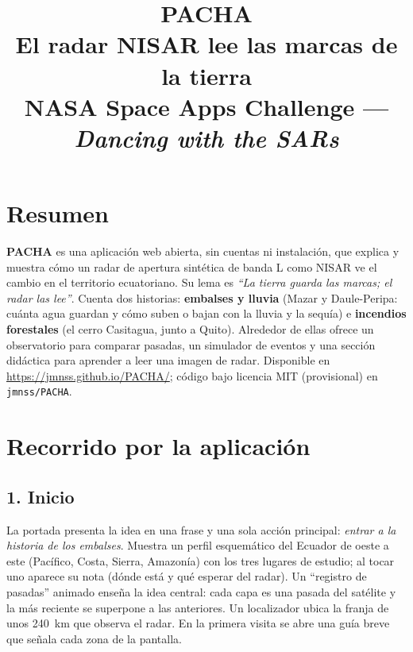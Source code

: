 \documentclass[11pt,a4paper]{article}
\title{\textbf{PACHA}\\[2pt]\large El radar NISAR lee las marcas de la tierra\\[2pt]\normalsize NASA Space Apps Challenge --- \emph{Dancing with the SARs}}
\author{}\date{}
\begin{document}
\maketitle\vspace{-2.5em}

\section*{Resumen}
\textbf{PACHA} es una aplicación web abierta, sin cuentas ni instalación, que explica y muestra cómo un radar de apertura sintética de banda L como NISAR ve el cambio en el territorio ecuatoriano. Su lema es \emph{``La tierra guarda las marcas; el radar las lee''}. Cuenta dos historias: \textbf{embalses y lluvia} (Mazar y Daule-Peripa: cuánta agua guardan y cómo suben o bajan con la lluvia y la sequía) e \textbf{incendios forestales} (el cerro Casitagua, junto a Quito). Alrededor de ellas ofrece un observatorio para comparar pasadas, un simulador de eventos y una sección didáctica para aprender a leer una imagen de radar. Disponible en \url{https://jmnss.github.io/PACHA/}; código bajo licencia MIT (provisional) en \texttt{jmnss/PACHA}.

\section*{Recorrido por la aplicación}

\subsection*{1. Inicio}
La portada presenta la idea en una frase y una sola acción principal: \emph{entrar a la historia de los embalses}. Muestra un perfil esquemático del Ecuador de oeste a este (Pacífico, Costa, Sierra, Amazonía) con los tres lugares de estudio; al tocar uno aparece su nota (dónde está y qué esperar del radar). Un ``registro de pasadas'' animado enseña la idea central: cada capa es una pasada del satélite y la más reciente se superpone a las anteriores. Un localizador ubica la franja de unos 240~km que observa el radar. En la primera visita se abre una guía breve que señala cada zona de la pantalla.
\end{document}
